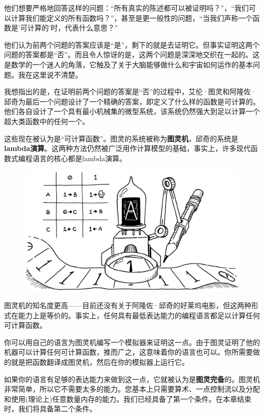 \documentclass[cn,11pt,chinese]{elegantbook}
\begin{document}
他们想要严格地回答这样的问题：“所有真实的陈述都可以被证明吗？”，“我们可以计算我们能定义的所有函数吗？”，甚至是更一般性的问题，“当我们声称一个函数是'可计算的'时，代表什么意思？”

他们认为前两个问题的答案应该是“是”，剩下的就是去证明它。但事实证明这两个问题的答案都是“否”。而且令人惊讶的是，这两个问题是深深地交织在一起的。这是数学的一个迷人的角落，它触及了关于大脑能够做什么和宇宙如何运作的基本问题。我在这里说不清楚。

我想指出的是，在证明前两个问题的答案是“否”的过程中，艾伦·图灵和阿隆佐·邱奇为最后一个问题设计了一个精确的答案，即定义了什么样的函数是可计算的。他们各自设计了一个具有最小机械集的微型系统，该系统仍然强大到足以计算一个超大类函数中的任何一个。

这些现在被认为是“可计算函数”。图灵的系统被称为\textbf{图灵机}，邱奇的系统是\textbf{lambda演算}。这两种方法仍然被广泛用作计算模型的基础，事实上，许多现代函数式编程语言的核心都是lambda演算。

\begin{figure}[htbp]
  \centering
  \includegraphics[width=\textwidth]{image/control-flow/turing-machine.png}
\end{figure}

图灵机的知名度更高——目前还没有关于阿隆佐·邱奇的好莱坞电影，但这两种形式在能力上是等价的。事实上，任何具有最低表达能力的编程语言都足以计算任何可计算函数。

你可以用自己的语言为图灵机编写一个模拟器来证明这一点。由于图灵证明了他的机器可以计算任何可计算函数，推而广之，这意味着你的语言也可以。你所需要做的就是把函数翻译成图灵机，然后在你的模拟器上运行它。

如果你的语言有足够的表达能力来做到这一点，它就被认为是\textbf{图灵完备}的。图灵机非常简单，所以它不需要太多的能力。您基本上只需要算术、一点控制流以及分配和使用(理论上)任意数量内存的能力。我们已经具备了第一个条件。在本章结束时，我们将具备第二个条件。
\end{document}
